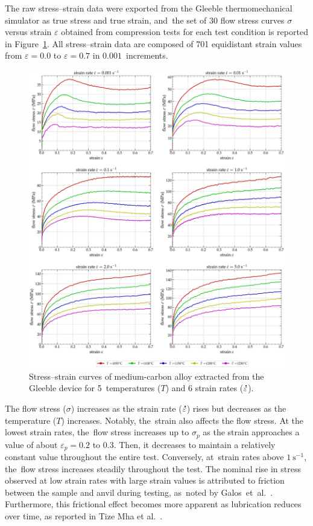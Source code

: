 \documentclass[metals,article,accept,pdftex,moreauthors]{Definitions/mdpi}
\makeatletter
\DeclareRobustCommand{\mdot}[1]{\accentset{\mbox{\bfseries .}}{#1}}
\DeclareRobustCommand{\eal}{et al.\@\xspace}
\DeclareRobustCommand{\ps}{\text{s}^{-1}}
\makeatother
\begin{document}
The raw stress--strain data were exported from the Gleeble thermomechanical simulator as true stress and true strain, and~the set of 30 flow stress curves $\sigma$ versus strain $\varepsilon$ obtained from compression tests for each test condition is reported in Figure~\ref{fig:RawData}.
All stress--strain data are composed of 701 equidistant strain values from $\varepsilon=0.0$ to $\varepsilon=0.7$ in $0.001$~increments.
\begin{figure}[H]
\centering
\includegraphics[width=0.9\columnwidth]{Figures/rawData}
\caption{Stress--strain curves of medium-carbon alloy extracted from the Gleeble device for \mbox{5 temperatures} ($T$) and 6 strain rates ($\mdot\varepsilon$).}
\label{fig:RawData}
\end{figure}

The flow stress ($\sigma$) increases as the strain rate ($\mdot\varepsilon$) rises but decreases as the temperature ($T$) increases.
Notably, the~strain also affects the flow stress.
At the lowest strain rates, the~flow stress increases up to $\sigma_p$ as the strain approaches a value of about $\varepsilon_p=0.2$ to $0.3$.
Then, it decreases to maintain a relatively constant value throughout the entire test.
Conversely, at~strain rates above $1~\ps$, the~flow stress increases steadily throughout the test.
The nominal rise in stress observed at low strain rates with large strain values is attributed to friction between the sample and anvil during testing, as~noted by \mbox{Galos \eal~\cite{Galos-2022}}.
\linebreak Furthermore, this frictional effect becomes more apparent as lubrication reduces over time, as reported in Tize Mha \eal~\cite{TizeMha-2023}.
\end{document}
